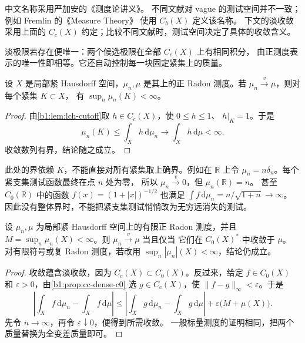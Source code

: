 中文名称采用严加安的《测度论讲义》\cite[第6.5节]{Yan2004Cedulun}。
不同文献对 vague 的测试空间并不一致；例如 Fremlin 的《Measure Theory》%
\cite[437J(c)]{Fremlin2016Measure}使用 \(C_b(X)\) 定义该名称。
下文的淡收敛采用上面的 \(C_c(X)\) 约定；比较不同文献时，测试空间决定了具体的收敛含义。

\ProseParagraphBreak

淡极限若存在便唯一：两个候选极限在全部 \(C_c(X)\) 上有相同积分，
由正测度表示的唯一性即相等。它还自动控制每一块固定紧集上的质量。

\begin{proposition}\label{b1:prop:vague-local-bound}
设 \(X\) 是局部紧 Hausdorff 空间，\(\mu_n,\mu\) 是其上的正 Radon 测度。若 \(\mu_n\xrightarrow{v}\mu\)，则对每个紧集 \(K\subset X\)，
有 \(\sup_n\mu_n(K)<\infty\)。
\end{proposition}
\begin{proof}
由\cref{b1:lem:lch-cutoff}取 \(h\in C_c(X)\)，使 \(0\leq h\leq1\)、
\(h|_K=1\)。于是
\[
 \mu_n(K)\leq\int_X h\,\mathrm{d}\mu_n\longrightarrow\int_X h\,\mathrm{d}\mu<\infty.
\]
收敛数列有界，结论随之成立。
\end{proof}

此处的界依赖 \(K\)，不能直接对所有紧集取上确界。例如在 \(\mathbb R\) 上令
\(\mu_n=n\delta_n\)。每个紧支集测试函数最终在点 \(n\) 处为零，
所以 \(\mu_n\xrightarrow{v}0\)，但 \(\mu_n(\mathbb R)=n\)。
甚至 \(C_0(\mathbb R)\) 中的函数 \(f(x)=(1+|x|)^{-1/2}\) 也满足
\(\int f\,\mathrm{d}\mu_n=n/\sqrt{1+n}\to\infty\)。
因此没有整体界时，不能把紧支集测试悄悄改为无穷远消失的测试。

\begin{proposition}\label{b1:prop:vague-c0-bounded}
设 \(\mu_n,\mu\) 为局部紧 Hausdorff 空间上的有限正 Radon 测度，并且
\(M=\sup_n\mu_n(X)<\infty\)。则 \(\mu_n\xrightarrow{v}\mu\) 当且仅当
它们在 \(C_0(X)^*\) 中\WeakStar{}收敛于 \(\mu\)。
对有限符号或复 Radon 测度，若改用 \(\sup_n|\mu_n|(X)<\infty\)，结论仍成立。
\end{proposition}
\begin{proof}
\WeakStar{}收敛蕴含淡收敛，因为 \(C_c(X)\subset C_0(X)\)。反过来，给定
\(f\in C_0(X)\) 和 \(\varepsilon>0\)，由\cref{b1:prop:cc-dense-c0}%
选 \(g\in C_c(X)\)，使 \(\|f-g\|_\infty<\varepsilon\)。于是
\[
 \left|\int_X f\,\mathrm{d}\mu_n-\int_X f\,\mathrm{d}\mu\right|
 \leq\left|\int_X g\,\mathrm{d}\mu_n-\int_X g\,\mathrm{d}\mu\right|
       +\varepsilon\bigl(M+\mu(X)\bigr).
\]
先令 \(n\to\infty\)，再令 \(\varepsilon\downarrow0\)，便得到所需收敛。
一般标量测度的证明相同，把两个质量替换为全变差质量即可。
\end{proof}

